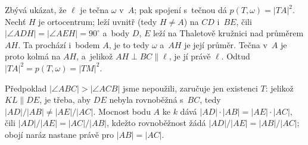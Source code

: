 {    Zbývá ukázat, že $\ell$ je tečna $\omega$ v~$A$; pak spojení s~tečnou dá $p(T,\omega) = |TA|^2$. Nechť $H$ je ortocentrum; leží uvnitř (tedy $H \neq A$) na $CD$ i~$BE$, čili $|\angle ADH| = |\angle AEH| = 90^\circ$ a~body $D$, $E$ leží na Thaletově kružnici nad průměrem $AH$. Ta prochází i~bodem $A$, je to tedy $\omega$ a~$AH$ je její průměr. Tečna v~$A$ je proto kolmá na $AH$, a~jelikož $AH \perp BC \parallel \ell$, je jí právě $\ell$. Odtud $|TA|^2 = p(T,\omega) = |TM|^2$.

    Předpoklad $|\angle ABC| > |\angle ACB|$ jsme nepoužili, zaručuje jen existenci $T$: jelikož $KL \parallel DE$, je třeba, aby $DE$ nebyla rovnoběžná s~$BC$, tedy $|AD|/|AB| \neq |AE|/|AC|$. Mocnost bodu $A$ ke $k$ dává $|AD| \cdot |AB| = |AE| \cdot |AC|$, čili $|AD|/|AE| = |AC|/|AB|$, kdežto rovnoběžnost žádá $|AD|/|AE| = |AB|/|AC|$; obojí naráz nastane právě pro $|AB| = |AC|$.
}

